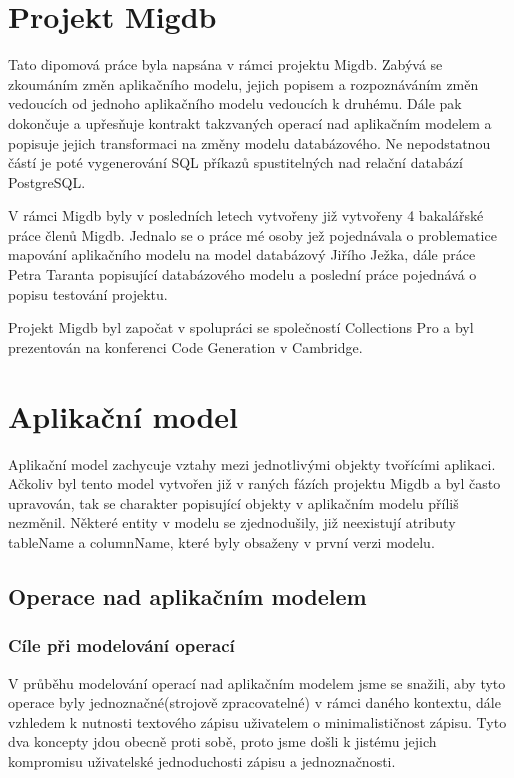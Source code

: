 \documentclass[11pt,twoside,a4paper]{book}
\begin{document}
\section{Projekt Migdb}

Tato dipomová práce byla napsána v rámci projektu Migdb. Zabývá se zkoumáním
změn aplikačního modelu, jejich popisem a rozpoznáváním změn vedoucích od
jednoho aplikačního modelu vedoucích k druhému. Dále pak dokončuje a upřesňuje
kontrakt takzvaných operací nad aplikačním modelem a popisuje jejich
transformaci na změny modelu databázového. Ne nepodstatnou částí je poté
vygenerování SQL příkazů spustitelných nad relační databází PostgreSQL.

V rámci Migdb byly v posledních letech vytvořeny již vytvořeny 4 bakalářské
práce členů Migdb. Jednalo se o práce mé osoby jež pojednávala o problematice
mapování aplikačního modelu na model databázový Jiřího Ježka, dále práce Petra
Taranta popisující databázového modelu a poslední práce pojednává o popisu
testování projektu.

Projekt Migdb byl započat v spolupráci se společností Collections Pro a byl
prezentován na konferenci Code Generation v Cambridge.

\section{Aplikační model}

Aplikační model zachycuje vztahy mezi jednotlivými objekty tvořícími
aplikaci. Ačkoliv byl tento model vytvořen již v raných fázích projektu Migdb a
byl často upravován, tak se charakter popisující objekty v aplikačním modelu
příliš nezměnil. Některé entity v modelu se zjednodušily,
již neexistují atributy tableName a columnName, které byly obsaženy v první
verzi modelu.

\subsection{Operace nad aplikačním modelem}
\subsubsection{Cíle při modelování operací}

V průběhu modelování operací nad aplikačním modelem jsme se snažili, aby tyto
operace byly jednoznačné(strojově zpracovatelné) v rámci daného kontextu, dále
vzhledem k nutnosti textového zápisu uživatelem o minimalističnost zápisu. Tyto
dva koncepty jdou obecně proti sobě, proto jsme došli k jistému jejich
kompromisu uživatelské jednoduchosti zápisu a jednoznačnosti.
\end{document}
